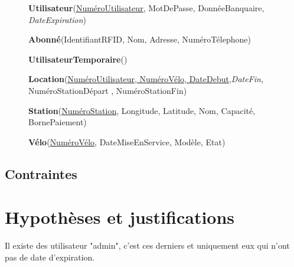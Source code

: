 \documentclass[a4paper,10pt]{article}
\begin{document}
\begin{description}
\item[] \textbf{Utilisateur}(\underline{NuméroUtilisateur}, MotDePasse, DonnéeBanquaire, \textit{DateExpiration})

\item[] \textbf{Abonné}(IdentifiantRFID, Nom, Adresse, NuméroTélephone)

\item[] \textbf{UtilisateurTemporaire}()

\item[] \textbf{Location}(\underline{NuméroUtilisateur, NuméroVélo, DateDebut},\textit{DateFin}, NuméroStationDépart , NuméroStationFin) %
	
\item[] \textbf{Station}(\underline{NuméroStation}, Longitude, Latitude, Nom, Capacité, BornePaiement)

 \item[] \textbf{Vélo}(\underline{NuméroVélo}, DateMiseEnService, Modèle, Etat)

\end{description}

\subsection{Contraintes}

\section{Hypothèses et justifications}

Il existe des utilisateur "admin", c'est ces derniers et uniquement eux qui n'ont pas de date d'expiration.
\end{document}
